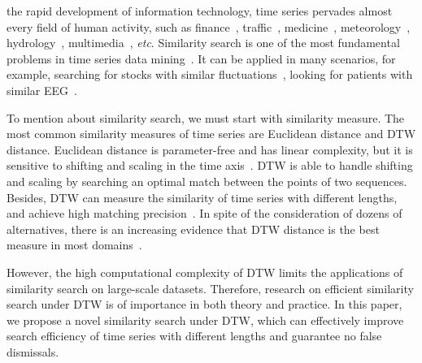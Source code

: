 \documentclass[10pt,journal,compsoc]{IEEEtran}
\begin{document}
\maketitle


\IEEEdisplaynontitleabstractindextext




\IEEEpeerreviewmaketitle




 the rapid development of information technology,
time series pervades almost every field of human activity,
such as finance~\cite{Sezer2018Algorithmic}, traffic~\cite{Hong2018A}, medicine~\cite{Pradhan2017Association},
meteorology~\cite{Wang2018A}, hydrology~\cite{Vesakoski2017Arctic}, multimedia~\cite{Zhao2017Real}, \emph{etc}.
Similarity search is one of the most fundamental problems in time series data mining~\cite{Qin2018Salient}.
It can be applied in many scenarios, for example, searching for stocks with similar fluctuations~\cite{Rubio2017Improving},
looking for patients with similar EEG~\cite{Chaovalitwongse2006EEG}.

To mention about similarity search, we must start with similarity measure.
The most common similarity measures of time series are Euclidean distance and DTW distance.
Euclidean distance is parameter-free and has linear complexity,
but it is sensitive to shifting and scaling in the time axis~\cite{2017articleDTW}.
DTW is able to handle shifting and scaling
by searching an optimal match between the points of two sequences.
Besides, DTW can measure the similarity of time series with different lengths,
and achieve high matching precision~\cite{Jeong2011Weighted}.
In spite of the consideration of dozens of alternatives,
there is an increasing evidence that DTW distance is the best measure in most domains~\cite{Ding2008}.

However, the high computational complexity of DTW limits the applications of similarity search on large-scale datasets.
Therefore, research on efficient similarity search under DTW is of importance in both theory and practice.
In this paper, we propose a novel similarity search under DTW,
which can effectively improve search efficiency of time series with different lengths and guarantee no false dismissals.
\end{document}
